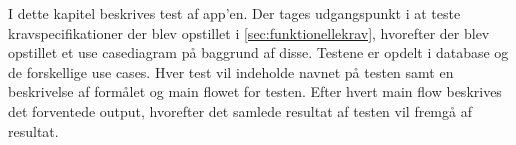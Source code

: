 I dette kapitel beskrives test af app'en. Der tages udgangspunkt i at teste kravspecifikationer der blev opstillet i \autoref{sec:funktionellekrav}, hvorefter der blev opstillet et use casediagram på baggrund af disse. Testene er opdelt i database og de forskellige use cases. Hver test vil indeholde navnet på testen samt en beskrivelse af formålet og main flowet for testen. Efter hvert main flow beskrives det forventede output, hvorefter det samlede resultat af testen vil fremgå af resultat.  
